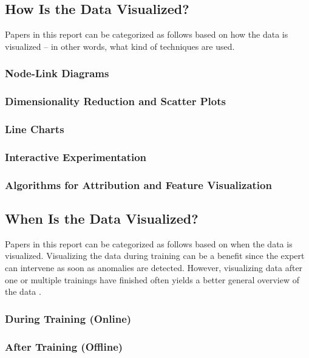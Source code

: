 \documentclass{acmsiggraph}               %
\begin{document}
\subsection{How Is the Data Visualized?}
Papers in this report can be categorized as follows based on how the data is visualized -- in other words, what kind of techniques are used.
\subsubsection{Node-Link Diagrams}
\subsubsection{Dimensionality Reduction and Scatter Plots}
\subsubsection{Line Charts}
\subsubsection{Interactive Experimentation}
\subsubsection{Algorithms for Attribution and Feature Visualization}

\subsection{When Is the Data Visualized?}
Papers in this report can be categorized as follows based on when the data is visualized. Visualizing the data during training can be a benefit since the expert can intervene as soon as anomalies are detected. However, visualizing data after one or multiple trainings have finished often yields a better general overview of the data \cite{Hohman2018}.
\subsubsection{During Training (Online)}
\subsubsection{After Training (Offline)}


\nocite{*}

\end{document}
